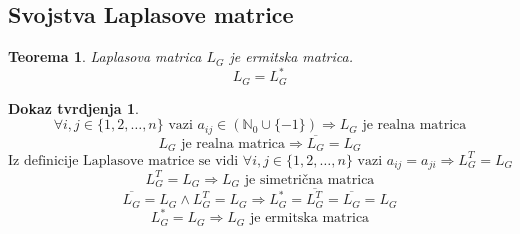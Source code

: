 \documentclass[11pt]{article}
\newtheorem{theorem}{Teorema}
\newtheorem*{custom_proof}{Dokaz tvrdjenja}
\begin{document}
	\subsection{Svojstva Laplasove matrice}
	
	\begin{theorem} Laplasova matrica $L_G$ je ermitska matrica.
	\[
	L_G = L_G^*
	\] 
	\end{theorem}
	
	\begin{custom_proof}
	\[
	\forall i,j \in \{1, 2, \dots, n\} \text{ vazi } a_{ij} \in (\mathbb{N}_0 \cup \{-1\}) \Rightarrow L_G \text{ je realna matrica}
	\]
	\[
	 L_G \text{ je realna matrica} \Rightarrow \overline{L_G} = L_G 
	\]
	\[
	\text{Iz definicije Laplasove matrice se vidi } \forall i,j \in \{1, 2, \dots, n\} \text{ vazi } a_{ij} = a_{ji} \Rightarrow L_G^T = L_G 
	\]
	\[
	  L_G^T = L_G \Rightarrow L_G \text{ je simetrična matrica}
	\]
	\[
	\overline{L_G} = L_G \land L_G^T = L_G \Rightarrow L_G^* = \overline{L_G^T} = \overline{L_G} = L_G 
	\]
	\[
	L_G^* = L_G \Rightarrow L_G\text{ je ermitska matrica}
	\]
	\end{custom_proof}
	
\end{document}

